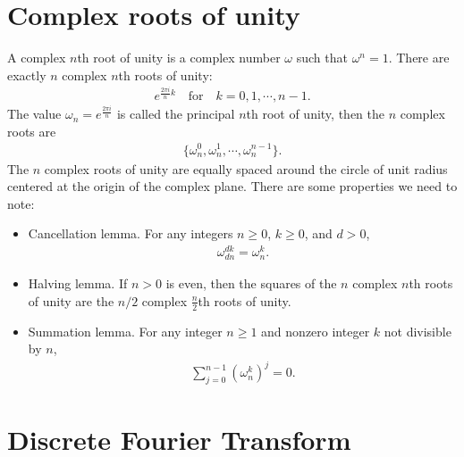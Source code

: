 \documentclass{article}
\begin{document}
\appendix


\section{Complex roots of unity}
A complex $n$th root of unity is a complex number $\omega$ such that $\omega^n=1$. There are exactly $n$ complex $n$th roots of unity: 
\begin{align}
	e^{\frac{2\pi i}{n}k} \quad \text{for} \quad k = 0,1, \cdots, n-1.
\end{align}
The value $\omega_n=e^{\frac{2\pi i}{n}}$ is called the principal $n$th root of unity, then the $n$ complex roots are \begin{align}
	\{\omega_n^0, \omega_n^1, \cdots, \omega_n^{n-1}\}.
\end{align}
The $n$ complex roots of unity are equally spaced around the circle of unit radius centered at the origin of the complex plane.
There are some properties we need to note:
\begin{itemize}
	\item Cancellation lemma. For any integers $n\ge 0$, $k\ge 0$, and $d>0$, 
	\begin{align}
		\omega_{dn}^{dk} = \omega_{n}^{k}.
	\end{align}

	\item Halving lemma. If $n>0$ is even, then the squares of the $n$ complex $n$th roots of unity are the $n/2$ complex $\frac{n}{2}$th roots of unity.
	
	\item Summation lemma. For any integer $n\ge 1$ and nonzero integer $k $ not divisible by $n$, 
	\begin{align}
		\sum_{j=0}^{n-1}(\omega_n^k)^j = 0.
	\end{align}
\end{itemize}


\section{Discrete Fourier Transform} \label{DFT}
\end{document}
